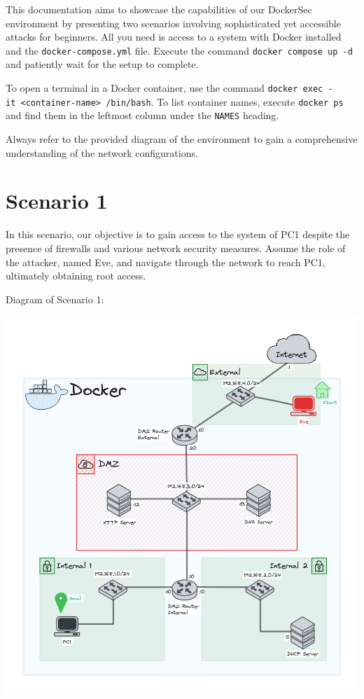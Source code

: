 \documentclass[a4paper,11pt,singlespacing]{article}
\begin{document}
This documentation aims to showcase the capabilities of our DockerSec
environment by presenting two scenarios involving sophisticated yet
accessible attacks for beginners. All you need is access to a system
with Docker installed and the \texttt{docker-compose.yml} file. Execute
the command \texttt{docker\ compose\ up\ -d} and patiently wait for the
setup to complete.

To open a terminal in a Docker container, use the command
\texttt{docker\ exec\ -it\ \textless{}container-name\textgreater{}\ /bin/bash}.
To list container names, execute \texttt{docker\ ps} and find them in
the leftmost column under the \texttt{NAMES} heading.

Always refer to the provided diagram of the environment to gain a
comprehensive understanding of the network configurations.

\newpage

\section{Scenario 1}\label{scenario-1}

In this scenario, our objective is to gain access to the system of PC1
despite the presence of firewalls and various network security measures.
Assume the role of the attacker, named Eve, and navigate through the
network to reach PC1, ultimately obtaining root access.

Diagram of Scenario 1:

\includegraphics{./Images/Diagram1.png}
\end{document}
